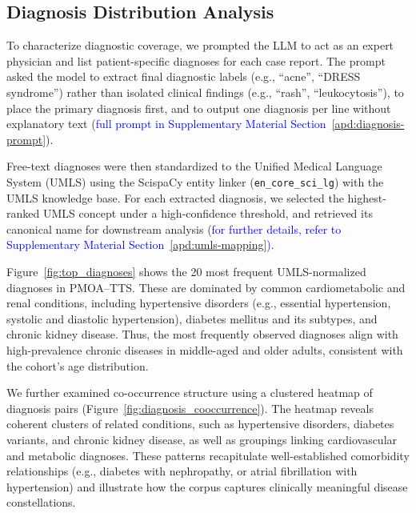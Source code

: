 \documentclass[pdflatex,sn-mathphys-num]{sn-jnl}%
\theoremstyle{thmstyleone}%
\theoremstyle{thmstyletwo}%
\theoremstyle{thmstylethree}%
\begin{document}
\subsection{Diagnosis Distribution Analysis}
\label{diagnosis-distribution-analysis}

To characterize diagnostic coverage, we prompted the LLM to act as an expert physician and list patient-specific diagnoses for each case report. 
The prompt asked the model to extract final diagnostic labels (e.g., ``acne'', ``DRESS syndrome'') rather than isolated clinical findings (e.g., ``rash'', ``leukocytosis''), to place the primary diagnosis first, and to output one diagnosis per line without explanatory text (\textcolor{blue}{full prompt in Supplementary Material Section~\ref{apd:diagnosis-prompt}}).

Free-text diagnoses were then standardized to the Unified Medical Language System (UMLS) using the ScispaCy entity linker (\texttt{en\_core\_sci\_lg}) with the UMLS knowledge base. 
For each extracted diagnosis, we selected the highest-ranked UMLS concept under a high-confidence threshold, and retrieved its canonical name for downstream analysis (\textcolor{blue}{for further details, refer to Supplementary Material Section~\ref{apd:umls-mapping})}.

Figure~\ref{fig:top_diagnoses} shows the 20 most frequent UMLS-normalized diagnoses in PMOA--TTS. 
These are dominated by common cardiometabolic and renal conditions, including hypertensive disorders (e.g., essential hypertension, systolic and diastolic hypertension), diabetes mellitus and its subtypes, and chronic kidney disease. 
Thus, the most frequently observed diagnoses align with high-prevalence chronic diseases in middle-aged and older adults, consistent with the cohort's age distribution.

We further examined co-occurrence structure using a clustered heatmap of diagnosis pairs (Figure~\ref{fig:diagnosis_cooccurrence}). 
The heatmap reveals coherent clusters of related conditions, such as hypertensive disorders, diabetes variants, and chronic kidney disease, as well as groupings linking cardiovascular and metabolic diagnoses. 
These patterns recapitulate well-established comorbidity relationships (e.g., diabetes with nephropathy, or atrial fibrillation with hypertension) and illustrate how the corpus captures clinically meaningful disease constellations. 
\end{document}
